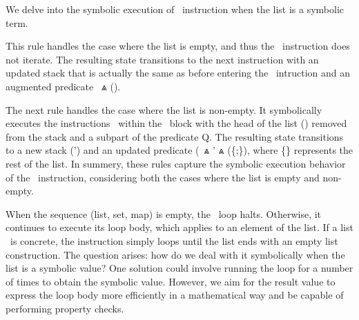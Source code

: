 \documentclass[a4paper,UKenglish,cleveref, autoref, thm-restate]{lipics-v2021}
\begin{document}
We delve into the symbolic execution of \ITER\ instruction when the list is a symbolic term.
\begin{mathpar}
\end{mathpar}
This rule handles the case where the list is empty, and thus the \ITER\ instruction does not iterate. The resulting state transitions to the next instruction with an updated stack that is actually the same as before entering the \ITER\ intruction and an augmented predicate \PREDICATE\ $\Wedge$ (\StackOne \EQ \EMPTYLIST).
\begin{mathpar}
\end{mathpar}
The next rule handles the case where the list is non-empty. It symbolically executes the instructions \INSTRUCTIONONE\ within the \ITER\ block with the head of the list (\HEAD) removed from the stack and a subpart of the predicate Q. The resulting state transitions to a new stack (\STACK') and an updated predicate (\PREDICATE\ $\Wedge$ \Q' $\Wedge$ (\StackOne \EQ \{\HEAD;\STAIL\}), where \{\STAIL\} represents the rest of the list.
In summery, these rules capture the symbolic execution behavior of the \ITER\ instruction, considering both the cases where the list is empty and non-empty.

When the sequence (list, set, map) is empty, the \ITER\ loop halts. Otherwise, it continues to execute its loop body, which applies to an element of the list. If a list \LIST\ is concrete, the instruction simply loops until the list ends with an empty list construction. The question arises: how do we deal with it symbolically when the list is a symbolic value? One solution could involve running the loop for a number of times to obtain the symbolic value. However, we aim for the result value to express the loop body more efficiently in a mathematical way and be capable of performing property checks.
\end{document}
